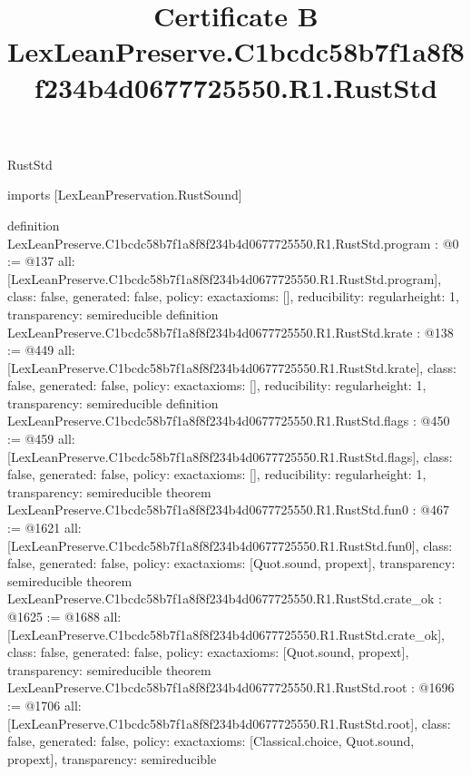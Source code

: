 \begin{lexlean}{RustStd}
\title{Certificate B LexLeanPreserve.C1bcdc58b7f1a8f8f234b4d0677725550.R1.RustStd}
\begin{coremodule}
imports [LexLeanPreservation.RustSound]

definition LexLeanPreserve.C1bcdc58b7f1a8f8f234b4d0677725550.R1.RustStd.program : @0 := @137 {
  all: [LexLeanPreserve.C1bcdc58b7f1a8f8f234b4d0677725550.R1.RustStd.program],
  class: false,
  generated: false,
  policy: exact{axioms: []},
  reducibility: regular{height: 1},
  transparency: semireducible
}
definition LexLeanPreserve.C1bcdc58b7f1a8f8f234b4d0677725550.R1.RustStd.krate : @138 := @449 {
  all: [LexLeanPreserve.C1bcdc58b7f1a8f8f234b4d0677725550.R1.RustStd.krate],
  class: false,
  generated: false,
  policy: exact{axioms: []},
  reducibility: regular{height: 1},
  transparency: semireducible
}
definition LexLeanPreserve.C1bcdc58b7f1a8f8f234b4d0677725550.R1.RustStd.flags : @450 := @459 {
  all: [LexLeanPreserve.C1bcdc58b7f1a8f8f234b4d0677725550.R1.RustStd.flags],
  class: false,
  generated: false,
  policy: exact{axioms: []},
  reducibility: regular{height: 1},
  transparency: semireducible
}
theorem LexLeanPreserve.C1bcdc58b7f1a8f8f234b4d0677725550.R1.RustStd.fun0 : @467 := @1621 {
  all: [LexLeanPreserve.C1bcdc58b7f1a8f8f234b4d0677725550.R1.RustStd.fun0],
  class: false,
  generated: false,
  policy: exact{axioms: [Quot.sound, propext]},
  transparency: semireducible
}
theorem LexLeanPreserve.C1bcdc58b7f1a8f8f234b4d0677725550.R1.RustStd.crate_ok : @1625 := @1688 {
  all: [LexLeanPreserve.C1bcdc58b7f1a8f8f234b4d0677725550.R1.RustStd.crate_ok],
  class: false,
  generated: false,
  policy: exact{axioms: [Quot.sound, propext]},
  transparency: semireducible
}
theorem LexLeanPreserve.C1bcdc58b7f1a8f8f234b4d0677725550.R1.RustStd.root : @1696 := @1706 {
  all: [LexLeanPreserve.C1bcdc58b7f1a8f8f234b4d0677725550.R1.RustStd.root],
  class: false,
  generated: false,
  policy: exact{axioms: [Classical.choice, Quot.sound, propext]},
  transparency: semireducible
}


\end{coremodule}
\end{lexlean}
